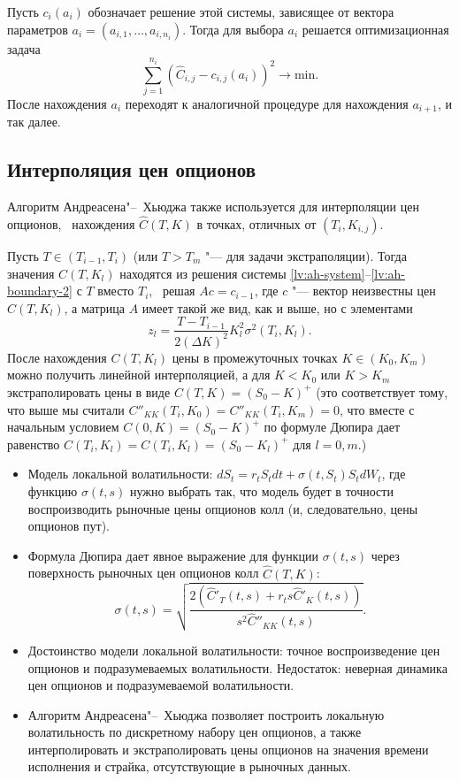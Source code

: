 Пусть $c_i(a_i)$ обозначает решение этой системы, зависящее от вектора параметров $a_i=(a_{i,1},\dots,a_{i,n_i})$. 
Тогда для выбора $a_i$ решается оптимизационная задача
\[
\sum_{j=1}^{n_i} (\hat C_{i,j} - c_{i,j}(a_i))^2 \to \text{min}.
\]
После нахождения $a_i$ переходят к аналогичной процедуре для нахождения $a_{i+1}$, и так далее.


\subsection{Интерполяция цен опционов}
Алгоритм Андреасена"--~Хьюджа также используется для интерполяции цен опционов, \te\ нахождения $\hat C(T,K)$ в точках, отличных от $(T_i,K_{i,j})$.

Пусть $T\in(T_{i-1},T_i)$ (или $T>T_m$ "--- для задачи экстраполяции).
Тогда значения $C(T,K_l)$ находятся из решения системы \eqref{lv:ah-system}--\eqref{lv:ah-boundary-2} с $T$ вместо $T_i$, \te\ решая $Ac = c_{i-1}$, где $c$ "--- вектор неизвестны цен $C(T,K_l)$, а матрица $A$ имеет такой же вид, как и выше, но с элементами
\[
z_l = \frac{T-T_{i-1}}{2(\Delta K)^2} K_l^2\sigma^2(T_i,K_l).
\]
После нахождения $C(T,K_l)$ цены в промежуточных точках $K\in (K_0,K_m)$ можно получить линейной интерполяцией, а для $K< K_0$ или $K>K_m$ экстраполировать цены в виде $C(T,K) = (S_0-K)^+$ (это соответствует тому, что выше мы считали $C''_{KK}(T_i,K_0) = C''_{KK}(T_i,K_m) = 0$, что вместе с начальным условием $C(0,K) = (S_0-K)^+$  по формуле Дюпира дает равенство $C(T_i,K_l) = C(T_i,K_l) = (S_0-K_l)^+$ для $l=0,m$.)


\summary
\begin{itemize}
\item Модель локальной волатильности: $d S_t = r_tS_t dt + \sigma(t,S_t)S_t d W_t$, где функцию $\sigma(t,s)$ нужно выбрать так, что модель будет в точности воспроизводить рыночные цены опционов колл (и, следовательно, цены опционов пут).

\item Формула Дюпира дает явное выражение для функции $\sigma(t,s)$ через поверхность рыночных цен опционов колл $\hat C(T,K)$:
\[
\sigma(t,s) = \sqrt{\frac{2(\hat C'_T(t,s) + r_ts\hat C'_K(t,s))}{s^2\hat C''_{KK}(t,s)}}.
\]

\item Достоинство модели локальной волатильности: точное воспроизведение цен опционов и подразумеваемых волатильности.
Недостаток: неверная динамика цен опционов и подразумеваемой волатильности.

\item Алгоритм Андреасена"--~Хьюджа позволяет построить локальную волатильность по дискретному набору цен опционов, а также интерполировать и экстраполировать цены опционов на значения времени исполнения и страйка, отсутствующие в рыночных данных.
\end{itemize}
